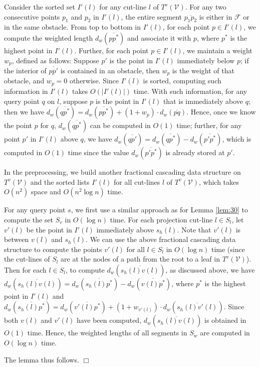 \documentclass[english,runningheads,11pt]{llncs}
\def\calF{\mathcal{F}}
\def\calV{\mathcal{V}}
\newenvironment{proof}{\noindent {\textbf{Proof:}}\rm}{\hfill $\Box$\rm}
\begin{document}
\begin{proof}
Consider the sorted set $I'(l)$ for any cut-line $l$ of $T^v(\calV)$. For
any two consecutive points $p_1$ and $p_2$ in $I'(l)$, the entire segment
$\overline{p_1p_2}$ is either in $\calF$ or in the same
obstacle. From top to bottom in $I'(l)$, for each point $p\in I'(l)$,
we compute the weighted length $d_w(\overline{pp^*})$ and associate it with
$p$, where $p^*$ is the highest point in $I'(l)$.  Further, for each point $p\in I'(l)$,
we maintain a weight $w_p$, defined as follows: Suppose $p'$ is the point in
$I'(l)$ immediately below $p$; if the interior of $\overline{pp'}$ is
contained in an obstacle, then $w_p$ is the weight of that obstacle, and
$w_p=0$ otherwise.
Since $I'(l)$ is sorted, computing such information in $I'(l)$ takes $O(|I'(l)|)$ time.
With such information, for any query point
$q$ on $l$, suppose $p$ is the point in $I'(l)$ that is
immediately above $q$; then we have
$d_w(\overline{qp^*})=d_w(\overline{pp^*})+(1+w_p)\cdot d_w(\overline{pq})$.
Hence, once we know the point $p$ for $q$,
 $d_w(\overline{qp^*})$ can be computed in $O(1)$ time; further,
for any point $p'$ in $I'(l)$ above $q$, we have $d_w(\overline{qp'})=d_w(\overline{qp^*})-d_w(\overline{p'p^*})$, which
is computed in $O(1)$ time since the value $d_w(\overline{p'p^*})$ is already stored at $p'$.

In the preprocessing, we build another fractional cascading data structure on $T^v(\calV)$
and the sorted lists $I'(l)$ for all cut-lines $l$ of $T^v(\calV)$, which takes $O(n^2)$ space and $O(n^2\log n)$ time.

For any query point $s$, we first use a similar approach as for Lemma \ref{lem:30} to compute
the set $S_v$ in $O(\log n)$ time. For each projection cut-line $l\in S_l$, let $v'(l)$
be the point in $I'(l)$ immediately above $s_h(l)$. Note that $v'(l)$ is between $v(l)$
and $s_h(l)$. We can use the above fractional cascading data structure to compute the points
$v'(l)$ for all $l\in S_l$ in $O(\log n)$ time (since the cut-lines of $S_l$ are at the nodes
of a path from the root to a leaf in $T^v(\calV)$). Then for each $l\in S_l$, to compute
$d_w(\overline{s_h(l)v(l)})$, as discussed above, we have  $d_w(\overline{s_h(l)v(l)})=d_w(\overline{s_h(l)p^*})-d_w(\overline{v(l)p^*})$, where $p^*$ is the highest
point in $I'(l)$ and $d_w(\overline{s_h(l)p^*})=d_w(\overline{v'(l)p^*})+(1+w_{v'(l)})\cdot d_w(\overline{s_h(l)v'(l)})$.
Since both $v(l)$ and $v'(l)$ have been computed, $d_w(\overline{s_h(l)v(l)})$ is obtained
in $O(1)$ time. Hence, the weighted lengths of all segments in $S_w$ are computed in $O(\log n)$ time.

The lemma thus follows.
\end{proof}
\end{document}
